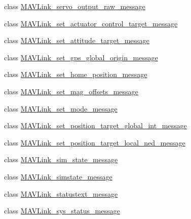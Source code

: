 \begin{DoxyCompactItemize}
\item 
class \hyperlink{classpymavlink_1_1dialects_1_1v10_1_1MAVLink__servo__output__raw__message}{M\+A\+V\+Link\+\_\+servo\+\_\+output\+\_\+raw\+\_\+message}
\item 
class \hyperlink{classpymavlink_1_1dialects_1_1v10_1_1MAVLink__set__actuator__control__target__message}{M\+A\+V\+Link\+\_\+set\+\_\+actuator\+\_\+control\+\_\+target\+\_\+message}
\item 
class \hyperlink{classpymavlink_1_1dialects_1_1v10_1_1MAVLink__set__attitude__target__message}{M\+A\+V\+Link\+\_\+set\+\_\+attitude\+\_\+target\+\_\+message}
\item 
class \hyperlink{classpymavlink_1_1dialects_1_1v10_1_1MAVLink__set__gps__global__origin__message}{M\+A\+V\+Link\+\_\+set\+\_\+gps\+\_\+global\+\_\+origin\+\_\+message}
\item 
class \hyperlink{classpymavlink_1_1dialects_1_1v10_1_1MAVLink__set__home__position__message}{M\+A\+V\+Link\+\_\+set\+\_\+home\+\_\+position\+\_\+message}
\item 
class \hyperlink{classpymavlink_1_1dialects_1_1v10_1_1MAVLink__set__mag__offsets__message}{M\+A\+V\+Link\+\_\+set\+\_\+mag\+\_\+offsets\+\_\+message}
\item 
class \hyperlink{classpymavlink_1_1dialects_1_1v10_1_1MAVLink__set__mode__message}{M\+A\+V\+Link\+\_\+set\+\_\+mode\+\_\+message}
\item 
class \hyperlink{classpymavlink_1_1dialects_1_1v10_1_1MAVLink__set__position__target__global__int__message}{M\+A\+V\+Link\+\_\+set\+\_\+position\+\_\+target\+\_\+global\+\_\+int\+\_\+message}
\item 
class \hyperlink{classpymavlink_1_1dialects_1_1v10_1_1MAVLink__set__position__target__local__ned__message}{M\+A\+V\+Link\+\_\+set\+\_\+position\+\_\+target\+\_\+local\+\_\+ned\+\_\+message}
\item 
class \hyperlink{classpymavlink_1_1dialects_1_1v10_1_1MAVLink__sim__state__message}{M\+A\+V\+Link\+\_\+sim\+\_\+state\+\_\+message}
\item 
class \hyperlink{classpymavlink_1_1dialects_1_1v10_1_1MAVLink__simstate__message}{M\+A\+V\+Link\+\_\+simstate\+\_\+message}
\item 
class \hyperlink{classpymavlink_1_1dialects_1_1v10_1_1MAVLink__statustext__message}{M\+A\+V\+Link\+\_\+statustext\+\_\+message}
\item 
class \hyperlink{classpymavlink_1_1dialects_1_1v10_1_1MAVLink__sys__status__message}{M\+A\+V\+Link\+\_\+sys\+\_\+status\+\_\+message}

\end{DoxyCompactItemize}
